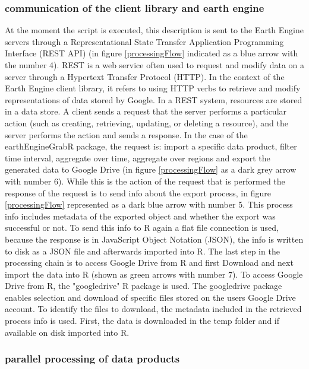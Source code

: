 \subsubsection{communication of the client library and earth engine}

At the moment the script is executed, this description is sent to the Earth Engine servers through a Representational State Transfer Application Programming Interface (REST API) (in figure \ref{processingFlow} indicated as a blue arrow with the number 4). REST is a web service often used to request and modify data on a server through a Hypertext Transfer Protocol (HTTP).
In the context of the Earth Engine client library, it refers to using HTTP verbs to retrieve and modify representations of data stored by Google.
In a REST system, resources are stored in a data store. A client sends a request that the server performs a particular action (such as creating, retrieving, updating, or deleting a resource), and the server performs the action and sends a response. In the case of the earthEngineGrabR package, the request is: import a specific data product, filter time interval, aggregate over time, aggregate over regions and export the generated data to Google Drive (in figure \ref{processingFlow} as a dark grey arrow with number 6). While this is the action of the request that is performed the response of the request is to send info about the export process, in figure \ref{processingFlow} represented as a dark blue arrow with number 5. This process info includes metadata of the exported object and whether the export was successful or not. To send this info to R again a flat file connection is used, because the response is in JavaScript Object Notation (JSON), the info is written to disk as a JSON file and afterwards imported into R. The last step in the processing chain is to access Google Drive from R and first Download and next import the data into R (shown as green arrows with number 7). To access Google Drive from R, the "googledrive" R package is used. The googledrive package enables selection and download of specific files stored on the users Google Drive account. To identify the files to download, the metadata included in the retrieved process info is used. First, the data is downloaded in the temp folder and if available on disk imported into R.

\subsubsection{parallel processing of data products}


